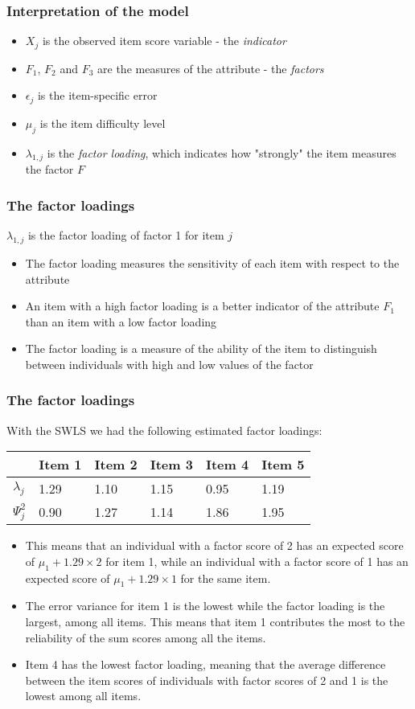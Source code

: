 \documentclass[compress]{beamer}
\begin{document}
\begin{frame}[fragile]
\frametitle{Interpretation of the model}
\begin{itemize}
\item $X_j$ is the observed item score variable - the \textit{indicator}
\item $F_1$, $F_2$ and $F_3$ are the measures of the attribute - the \textit{factors}
\item $\epsilon_j$ is the item-specific error
\item $\mu_j$ is the item difficulty level
\item $\lambda_{1,j}$ is the \textit{factor loading}, which indicates how "strongly" the item measures the factor $F$
\end{itemize}
\end{frame}

\begin{frame}[fragile]
\frametitle{The factor loadings}
$\lambda_{1,j}$ is the factor loading of factor 1 for item $j$ 
\begin{itemize}
\item The factor loading measures the sensitivity of each item with respect to the attribute
\item An item with a high factor loading is a better indicator of the attribute $F_1$ than an item with a low factor loading
\item The factor loading is a measure of the ability of the item to distinguish between individuals with high and low values of the factor
\end{itemize}
\end{frame}

\begin{frame}[fragile]
\frametitle{The factor loadings}
With the SWLS we had the following estimated factor loadings:
\begin{tabular}{l|lllll}
\hline
& Item 1 & Item 2 & Item 3 & Item 4 & Item 5\\
\hline
$\lambda_j$ & 1.29 & 1.10 & 1.15 & 0.95 & 1.19\\
$\Psi_j^2$ & 0.90 & 1.27 & 1.14 & 1.86 & 1.95\\
\hline
\end{tabular}
\begin{itemize}
\item This means that an individual with a factor score of 2 has an expected score of $\mu_1 + 1.29 \times 2$ for item 1, while an individual with a factor score of 1 has an expected score of $\mu_1 + 1.29 \times 1$ for the same item.
\item The error variance for item 1 is the lowest while the factor loading is the largest, among all items. This means that item 1 contributes the most to the reliability of the sum scores among all the items. 
\item Item 4 has the lowest factor loading, meaning that the average difference between the item scores of individuals with factor scores of 2 and 1 is the lowest among all items.
\end{itemize}
\end{frame}
\end{document}
